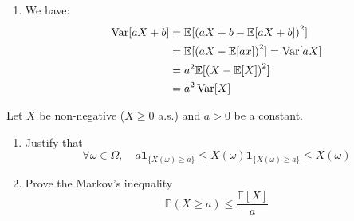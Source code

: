 \begin{solution}
\begin{enumerate}
    \item We have:
          \begin{align*}
            \operatorname{Var}[aX + b] & = \mathbb{E}[{(aX+b - \mathbb{E}[aX+b])}^2]        \\
                         & = \mathbb{E}[{(aX - \mathbb{E}[ax])}^2] = \operatorname{Var}[aX] \\
                         & = a^2 \mathbb{E}[{(X - \mathbb{E}[X])}^2]          \\
                         & = a^2 \operatorname{Var}[X]
          \end{align*}
  \end{enumerate}
\end{solution}

\begin{Exercise}
  Let $X$ be non-negative ($X \geq 0$ a.s.) and $a>0$ be a constant.
  \begin{enumerate}
    \item Justify that
          \[ \forall \omega \in \Omega, \quad a \mathbf{1}_{\{X(\omega) \geqslant a\}} \leqslant X(\omega) \mathbf{1}_{\{X(\omega) \geqslant a\}} \leqslant X(\omega) \]
    \item Prove the Markov's inequality
          \[
            \mathbb{P}(X \geq a) \leq \frac{\mathbb{E}[X]}{a}
          \]
  \end{enumerate}
\end{Exercise}

